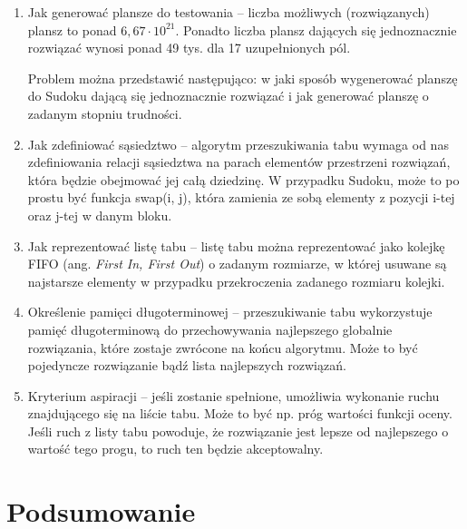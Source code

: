 \documentclass[]{project_report}
\begin{document}
	\begin{enumerate}
		\item Jak generować plansze do testowania -- liczba możliwych (rozwiązanych) plansz to ponad \(6,67 \cdot 10^{21}\)\cite{OEIS}. Ponadto liczba plansz dających się jednoznacznie rozwiązać wynosi ponad 49 tys. dla 17 uzupełnionych pól.
		
		Problem można przedstawić następująco: w jaki sposób wygenerować planszę do Sudoku dającą się jednoznacznie rozwiązać i jak generować planszę o zadanym stopniu trudności.
		
		\item Jak zdefiniować sąsiedztwo -- algorytm przeszukiwania tabu wymaga od nas zdefiniowania relacji sąsiedztwa na parach elementów przestrzeni rozwiązań, która będzie obejmować jej całą dziedzinę.  W przypadku Sudoku, może to po  prostu być funkcja swap(i, j), która zamienia ze sobą elementy z pozycji i-tej oraz j-tej w danym bloku.
		
		\item Jak reprezentować listę tabu -- listę tabu można reprezentować jako kolejkę FIFO (ang. \textit{First In, First Out}) o zadanym rozmiarze, w której usuwane są najstarsze elementy w przypadku przekroczenia zadanego rozmiaru kolejki.
		
		\item Określenie pamięci długoterminowej -- przeszukiwanie tabu wykorzystuje pamięć długoterminową do przechowywania najlepszego globalnie rozwiązania, które zostaje zwrócone na końcu algorytmu. Może to być pojedyncze rozwiązanie bądź lista najlepszych rozwiązań.
		
		\item Kryterium aspiracji -- jeśli zostanie spełnione, umożliwia wykonanie ruchu znajdującego się na liście tabu. Może to być np. próg wartości funkcji oceny. Jeśli ruch z listy tabu powoduje, że rozwiązanie jest lepsze od najlepszego o wartość tego progu, to ruch ten będzie akceptowalny.
		
	\end{enumerate}
	
	\section{Podsumowanie}
	
	
	\printbibliography
\end{document}
